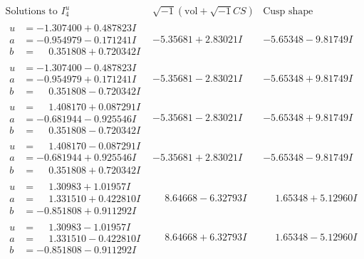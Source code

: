 \documentclass[1p]{elsarticle_modified}
\theoremstyle{definition}
\newcommand{\I}{\sqrt{-1}}
\begin{document}
$$\begin{array}{c|c|c}  
\text{Solutions to }I^u_{4}& \I (\text{vol} + \sqrt{-1}CS) & \text{Cusp shape}\\
 \hline 
\begin{aligned}
u &= -1.307400 + 0.487823 I \\
a &= -0.954979 - 0.171241 I \\
b &= \phantom{-}0.351808 + 0.720342 I\end{aligned}
 & -5.35681 + 2.83021 I & -5.65348 - 9.81749 I \\ \hline\begin{aligned}
u &= -1.307400 - 0.487823 I \\
a &= -0.954979 + 0.171241 I \\
b &= \phantom{-}0.351808 - 0.720342 I\end{aligned}
 & -5.35681 - 2.83021 I & -5.65348 + 9.81749 I \\ \hline\begin{aligned}
u &= \phantom{-}1.408170 + 0.087291 I \\
a &= -0.681944 - 0.925546 I \\
b &= \phantom{-}0.351808 - 0.720342 I\end{aligned}
 & -5.35681 - 2.83021 I & -5.65348 + 9.81749 I \\ \hline\begin{aligned}
u &= \phantom{-}1.408170 - 0.087291 I \\
a &= -0.681944 + 0.925546 I \\
b &= \phantom{-}0.351808 + 0.720342 I\end{aligned}
 & -5.35681 + 2.83021 I & -5.65348 - 9.81749 I \\ \hline\begin{aligned}
u &= \phantom{-}1.30983 + 1.01957 I \\
a &= \phantom{-}1.331510 + 0.422810 I \\
b &= -0.851808 + 0.911292 I\end{aligned}
 & \phantom{-}8.64668 - 6.32793 I & \phantom{-}1.65348 + 5.12960 I \\ \hline\begin{aligned}
u &= \phantom{-}1.30983 - 1.01957 I \\
a &= \phantom{-}1.331510 - 0.422810 I \\
b &= -0.851808 - 0.911292 I\end{aligned}
 & \phantom{-}8.64668 + 6.32793 I & \phantom{-}1.65348 - 5.12960 I \\ \hline\begin{aligned}

\end{aligned}
\end{array}$$
\end{document}
